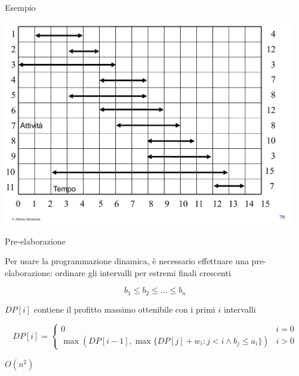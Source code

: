 \begin{frame}{Esempio}

\vspace{-12pt}
\begin{center}
\includegraphics[width=0.95\textwidth,page=2]{intervalli-esempio.pdf}
\end{center}

\end{frame}

\begin{frame}{Pre-elaborazione}

\vspace{-6pt}
Per usare la programmazione dinamica, è necessario effettuare una pre-elaborazione: ordinare gli intervalli per estremi finali crescenti

  \[
     b_1 \leq b_2 \leq \ldots \leq b_n
  \]

$DP[i]$ contiene il profitto massimo ottenibile con i primi $i$ intervalli

\[
  DP[i] = \begin{cases}
    0 & i = 0 \\
    \max (DP[i-1], \max \{ DP[j]+w_i : j < i \wedge b_j \leq a_i \} ) & i > 0
  \end{cases}
\]

\pause 

\smallskip
$O(n^2)$

\end{frame}

